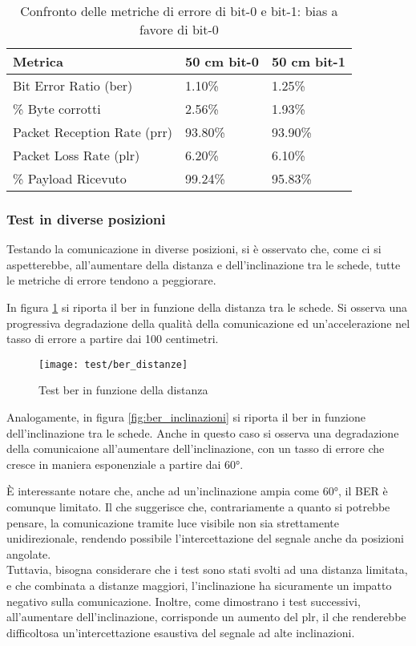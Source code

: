 \begin{table}[H]
    \caption{Confronto delle metriche di errore di bit-0 e bit-1: bias a favore di bit-0}
    \label{tab:bit-bias}
    \begin{tabularx}{\textwidth}{Xll}
        \hline
        \textbf{Metrica} & \textbf{50 cm bit-0} & \textbf{50 cm bit-1}\\
        \hline
        Bit Error Ratio (\gls{ber})            & 1.10\%  & 1.25\% \\
        \hline
        \% Byte corrotti                & 2.56\%  & 1.93\% \\
        \hline
        Packet Reception Rate (\gls{prr})     & 93.80\% & 93.90\% \\
        \hline
        Packet Loss Rate (\gls{plr})          & 6.20\%  & 6.10\% \\
        \hline
        \% Payload Ricevuto             & 99.24\% & 95.83\% \\
        \hline
    \end{tabularx}
\end{table}

\subsubsection{Test in diverse posizioni}
Testando la comunicazione in diverse posizioni, si è osservato che, come ci si aspetterebbe, all'aumentare della distanza e dell'inclinazione tra le schede, tutte le metriche di errore tendono a peggiorare.

In figura \ref{fig:ber_distanze} si riporta il \gls{ber} in funzione della distanza tra le schede. Si osserva una progressiva degradazione della qualità della comunicazione ed un'accelerazione nel tasso di errore a partire dai 100 centimetri.

\begin{figure}[H] 
    \centering 
    \texttt{[image: test/ber\_distanze]} 
    \caption{Test \gls{ber} in funzione della distanza}
    \label{fig:ber_distanze}
\end{figure}

Analogamente, in figura \ref{fig:ber_inclinazioni} si riporta il \gls{ber} in funzione dell'inclinazione tra le schede. Anche in questo caso si osserva una degradazione della comunicaione all'aumentare dell'inclinazione, con un tasso di errore che cresce in maniera esponenziale a partire dai 60°.

È interessante notare che, anche ad un'inclinazione ampia come 60°, il BER è comunque limitato. Il che suggerisce che, contrariamente a quanto si potrebbe pensare, la comunicazione tramite luce visibile non sia strettamente unidirezionale, rendendo possibile l'intercettazione del segnale anche da posizioni angolate.\\
Tuttavia, bisogna considerare che i test sono stati svolti ad una distanza limitata, e che combinata a distanze maggiori, l'inclinazione ha sicuramente un impatto negativo sulla comunicazione. Inoltre, come dimostrano i test successivi, all'aumentare dell'inclinazione, corrisponde un aumento del \gls{plr}, il che renderebbe difficoltosa un'intercettazione esaustiva del segnale ad alte inclinazioni.

